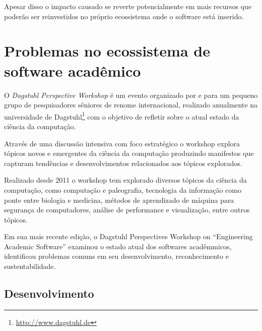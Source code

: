 Apesar disso o impacto causado se reverte potencialmente em mais
recursos que poderão ser reinvestidos no próprio ecossistema onde
o software está inserido.



\section{Problemas no ecossistema de software acadêmico}



O {\it Dagstuhl Perspective Workshop} é um evento organizado por e para um
pequeno grupo de pesquisadores sêniores de renome internacional, realizado
anualmente na universidade de Dagstuhl\footnote{\url{http://www.dagstuhl.de}}
com o objetivo de refletir sobre o atual estado da ciência da computação.

Através de uma discussão intensiva com foco estratégico o workshop explora
tópicos novos e emergentes da ciência da computação produzindo manifestos que
capturam tendências e desenvolvimentos relacionados aos tópicos explorados.

Realizado desde 2011 o workshop tem explorado diversos tópicos da ciência da
computação, como computação e paleografia, tecnologia da informação como ponte
entre biologia e medicina, métodos de aprendizado de máquina para segurança de
computadores, análise de performance e visualização, entre outros tópicos.

Em sua mais recente edição, o Dagstuhl Perspectives Workshop on ``Engineering
Academic Software'' \cite{allen2017engineering} examinou o estado atual dos
softwares acadêmmicos, identificou problemas comuns em seu desenvolvimento,
reconhecimento e sustentabilidade.

\subsection{Desenvolvimento}

